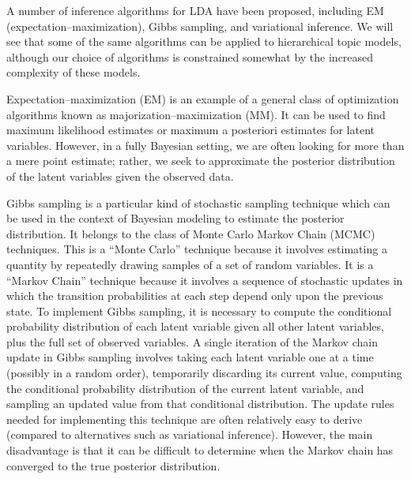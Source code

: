\documentclass{article}
\begin{document}
A number of inference algorithms for LDA have been proposed, including EM (expectation--maximization), Gibbs sampling, and variational inference.
We will see that some of the same algorithms can be applied to hierarchical topic models, although our choice of algorithms is constrained somewhat by the increased complexity of these models.

Expectation--maximization (EM) is an example of a general class of optimization algorithms known as majorization--maximization (MM).
It can be used to find maximum likelihood estimates or maximum a posteriori estimates for latent variables.
However, in a fully Bayesian setting, we are often looking for more than a mere point estimate; rather, we seek to approximate the posterior distribution of the latent variables given the observed data.

Gibbs sampling is a particular kind of stochastic sampling technique which can be used in the context of Bayesian modeling to estimate the posterior distribution.
It belongs to the class of Monte Carlo Markov Chain (MCMC) techniques.
This is a ``Monte Carlo'' technique because it involves estimating a quantity by repeatedly drawing samples of a set of random variables.
It is a ``Markov Chain'' technique because it involves a sequence of stochastic updates in which the transition probabilities at each step depend only upon the previous state.
To implement Gibbs sampling, it is necessary to compute the conditional probability distribution of each latent variable given all other latent variables, plus the full set of observed variables.
A single iteration of the Markov chain update in Gibbs sampling involves taking each latent variable one at a time (possibly in a random order), temporarily discarding its current value, computing the conditional probability distribution of the current latent variable, and sampling an updated value from that conditional distribution.
The update rules needed for implementing this technique are often relatively easy to derive (compared to alternatives such as variational inference).
However, the main disadvantage is that it can be difficult to determine when the Markov chain has converged to the true posterior distribution.
\end{document}
